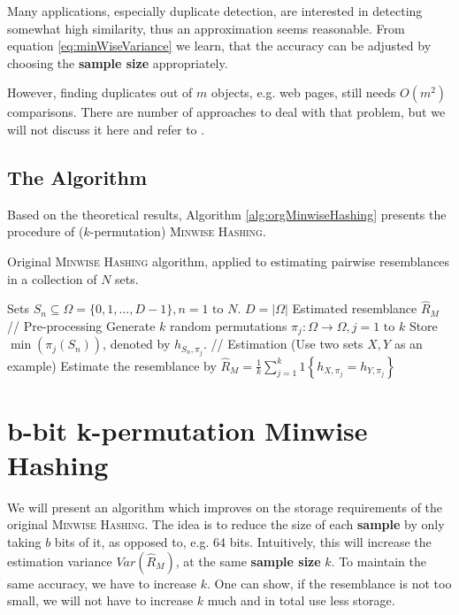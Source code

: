 \documentclass[a4paper]{article}
\begin{document}
Many applications, especially duplicate detection, are interested in detecting somewhat high similarity, thus an approximation seems reasonable. From equation \vref{eq:minWiseVariance} we learn, that the accuracy can be adjusted by choosing the \textbf{sample size} appropriately.

However, finding duplicates out of $m$ objects, e.g. web pages, still needs $O(m^2)$ comparisons. There are number of approaches to deal with that problem, but we will not discuss it here and refer to \citep{BroderGMZ97,STOC02*380}.



\subsection{The Algorithm}

Based on the theoretical results, Algorithm \vref{alg:orgMinwiseHashing} presents the procedure of ($k$-permutation) \textsc{Minwise Hashing}.

\begin{algorithm}[H]
\caption{Original \textsc{Minwise Hashing} algorithm, applied to estimating pairwise resemblances in a collection of $N$ sets.}
\label{alg:orgMinwiseHashing}
\begin{algorithmic}
\Require Sets $S_n \subseteq \Omega = \{0,1,\ldots,D-1\}, n = 1 \text{ to } N$. \Comment $D = \left| \Omega \right|$
\Ensure Estimated resemblance $\hat{R}_M$
\State // Pre-processing
\State Generate $k$ random permutations $\pi_j: \Omega\longrightarrow\Omega, j=1\text{ to }k$
	\State Store $\min(\pi_j(S_n))$, denoted by $h_{S_n,\pi_j}$.
\EndFor
\State
\State // Estimation (Use two sets $X,Y$ as an example)
\State Estimate the resemblance by $\hat{R}_M=\frac{1}{k}\sum_{j=1}^k 1 \left\lbrace h_{X,\pi_j}=h_{Y,\pi_j} \right\rbrace$
\end{algorithmic}
\end{algorithm}





\section{b-bit k-permutation Minwise Hashing}\label{sec:b-bitMinwiseHashing}

We will present an algorithm which improves on the storage requirements of the original \textsc{Minwise Hashing}. The idea is to reduce the size of each \textbf{sample} by only taking $b$ bits of it, as opposed to, e.g. $64$ bits. Intuitively, this will increase the estimation variance $Var(\hat{R}_M)$, at the same \textbf{sample size} $k$. To maintain the same accuracy, we have to increase $k$. One can show, if the resemblance is not too small, we will not have to increase $k$ much and in total use less storage.
\end{document}
